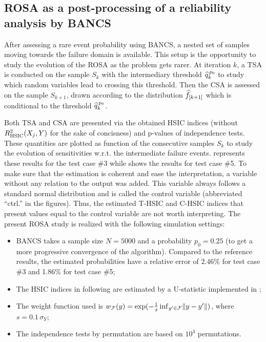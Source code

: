 \subsection{ROSA as a post-processing of a reliability analysis by BANCS}

After assessing a rare event probability using BANCS, a nested set of samples moving towards the failure domain is available.
This setup is the opportunity to study the evolution of the ROSA as the problem gets rarer.
At iteration $k$, a TSA is conducted on the sample $S_k$ with the intermediary threshold $\widehat{q}^{\, p_0}_k$ to study which random variables lead to crossing this threshold. 
Then the CSA is assessed on the sample $S_{k+1}$, drawn according to the distribution $\widehat{f}_{[k+1]}$ which is conditional to the threshold $\widehat{q}^{\, p_0}_k$. 

Both TSA and CSA are presented via the obtained HSIC indices (without $R^2_{\mathrm{HSIC}}(X_j, Y)$ for the sake of concisness) and p-values of independence tests. 
These quantities are plotted as function of the consecutive samples $S_k$ to study the evolution of sensitivities w.r.t. the intermediate failure events. 
 represents these results for the test case \#3 while  shows the results for test case \#5. 
To make sure that the estimation is coherent and ease the interpretation, a variable without any relation to the output was added. 
This variable always follows a standard normal distribution and is called the control variable (abbreviated ``ctrl.'' in the figures). 
Thus, the estimated T-HSIC and C-HSIC indices that present values equal to the control variable are not worth interpreting. 
The present ROSA study is realized with the following simulation settings:
\begin{itemize}
    \item BANCS takes a sample size $N=5000$ and a probability $p_0=0.25$ (to get a more progressive convergence of the algorithm). Compared to the reference results, the estimated probabilities have a relative error of $2.46\%$ for test case \#3 and 1.86$\%$ for test case \#5; 
    \item The HSIC indices in following are estimated by a U-statistic implemented in \ot; 
    \item The weight function used is $w_{\mathcal{F}}(y) = \exp(-\frac1s \, \mathrm{inf}_{y'\in \mathcal{F}} \Vert y -y' \Vert)$, where $s=0.1 \, \sigma_Y$;
    \item The independence tests by permutation are based on $10^3$ permutations.
\end{itemize}


